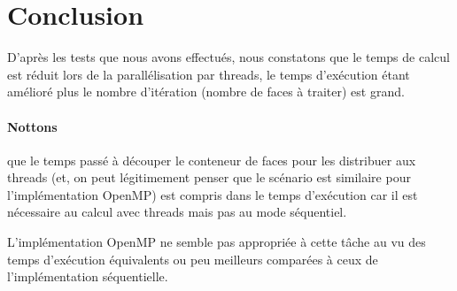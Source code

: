 \documentclass[a4paper]{article}
\begin{document}
\section{Conclusion}
D'après les tests que nous avons effectués, nous constatons que le temps de calcul est réduit lors de la parallélisation par threads, le temps d'exécution étant amélioré plus le nombre d'itération (nombre de faces à traiter) est grand.

\paragraph{Nottons} que le temps passé à découper le conteneur de faces pour les distribuer aux threads (et, on peut légitimement penser que le scénario est similaire pour l'implémentation OpenMP) est compris dans le temps d'exécution car il est nécessaire au calcul avec threads mais pas au mode séquentiel. 

L'implémentation OpenMP ne semble pas appropriée à cette tâche au vu des temps d'exécution équivalents ou peu meilleurs comparées à ceux de l'implémentation séquentielle.

\newpage


\end{document}
